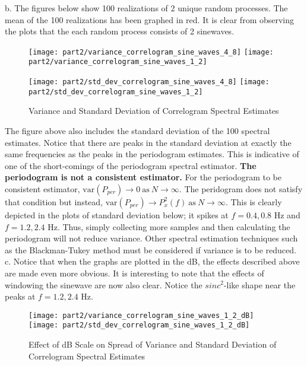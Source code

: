 \noindent{}b. The figures below show 100 realizations of 2 unique random processes. The mean of the 100 realizations has been graphed in red. It is clear from observing the plots that the each random process consists of 2 sinewaves.

\begin{figure}[H]
\centering{}
\texttt{[image: part2/variance\_correlogram\_sine\_waves\_4\_8]}
\texttt{[image: part2/variance\_correlogram\_sine\_waves\_1\_2]}
\end{figure}

\begin{figure}[H]
\centering{}
\texttt{[image: part2/std\_dev\_correlogram\_sine\_waves\_4\_8]}
\texttt{[image: part2/std\_dev\_correlogram\_sine\_waves\_1\_2]}
\caption{Variance and Standard Deviation of Correlogram Spectral Estimates}
\end{figure}

\noindent{}The figure above also includes the standard deviation of the 100 spectral estimates. Notice that there are peaks in the standard deviation at exactly the same frequencies as the peaks in the periodogram estimates. This is indicative of one of the short-comings of the periodogram spectral estimator. \textbf{The periodogram is not a consistent estimator.} For the periodogram to be consistent estimator, $\text{var}(P_{per}) \rightarrow 0  \ \text{as} \ N \rightarrow \infty$. The peridogram does not satisfy that condition but instead,  $\text{var}(P_{per}) \rightarrow P_{x}^{2}(f) \ \text{as} \ N \rightarrow \infty$. This is clearly depicted in the plots of standard deviation below; it spikes at $f=0.4, 0.8$ Hz and $f=1.2, 2.4$ Hz. Thus, simply collecting more samples and then calculating the periodogram will not reduce variance. Other spectral estimation techniques such as the Blackman-Tukey method must be considered if variance is to be reduced.\\

\noindent{}c. Notice that when the graphs are plotted in the dB, the effects described above are made even more obvious. It is interesting to note that the effects of windowing the sinewave are now also clear. Notice the $sinc^2$-like shape near the peaks at $f=1.2, 2.4$ Hz.
 
\begin{figure}[H]
\centering{}
\texttt{[image: part2/variance\_correlogram\_sine\_waves\_1\_2\_dB]}
\texttt{[image: part2/std\_dev\_correlogram\_sine\_waves\_1\_2\_dB]}
\caption{Effect of dB Scale on Spread of Variance and Standard Deviation of Correlogram Spectral Estimates}
\end{figure}

